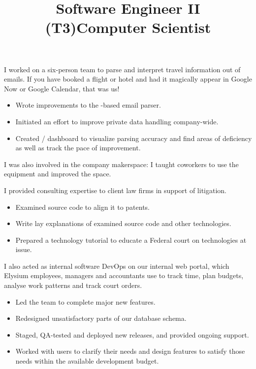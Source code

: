 \begin{resume}
\title{Software Engineer II (T3)}
\begin{position}
I worked on a six-person team to parse and interpret travel information out of
emails. If you have booked a flight or hotel and had it magically appear in
Google Now or Google Calendar, that was us!
\begin{itemize} 
  \item Wrote improvements to the \kw{\Cplusplus}-based email parser.
  \item Initiated an effort to improve private data handling company-wide.
  \item Created / dashboard to visualize parsing
        accuracy and find areas of deficiency as well as track the pace of
        improvement.
\end{itemize}

I was also involved in the company makerspace: I taught coworkers to use the
equipment and improved the space.


\end{position}


\title{Computer Scientist}
\begin{position}
I provided consulting expertise to client law firms in support of litigation.
\begin{itemize}
\item Examined source code to align it to patents.
\item Write lay explanations of examined source code and other technologies.
\item Prepared a technology tutorial to educate a Federal court on technologies
    at issue.
\end{itemize}

I also acted as internal software DevOps on our internal
web portal, which Elysium employees, managers and
accountants use to track
time, plan budgets, analyse work patterns and track court orders.
\begin{itemize}
\item Led the team to complete major new features.
\item Redesigned unsatisfactory parts of our database schema.
\item Staged, QA-tested and deployed new releases, and provided ongoing support.
\item Worked with users to clarify their needs and design features to satisfy
those needs within the available development budget.
\end{itemize}
\end{position}


\end{resume}
